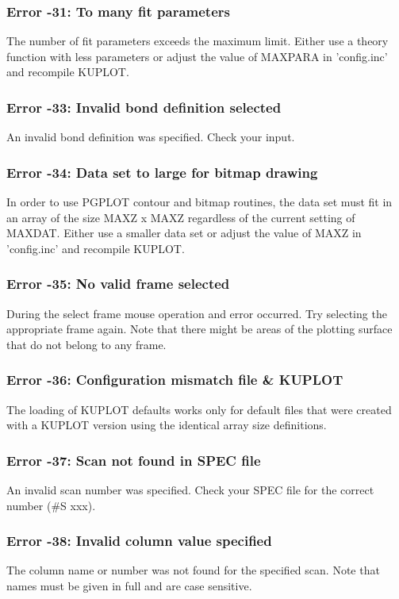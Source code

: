 \subsubsection{Error -31: To many fit parameters}
\par
The number of fit parameters exceeds the maximum limit. Either 
use a theory function with less parameters or adjust the value of 
MAXPARA in 'config.inc' and recompile KUPLOT. 
\subsubsection{Error -33: Invalid bond definition selected}
\par
An invalid bond definition was specified. Check your input. 
\subsubsection{Error -34: Data set to large for bitmap drawing}
\par
In order to use PGPLOT contour and bitmap routines, the data set 
must fit in an array of the size MAXZ x MAXZ regardless of the 
current setting of MAXDAT. Either use a smaller data set or adjust 
the value of MAXZ in 'config.inc' and recompile KUPLOT. 
\subsubsection{Error -35: No valid frame selected}
\par
During the select frame mouse operation and error occurred. Try 
selecting the appropriate frame again. Note that there might be 
areas of the plotting surface that do not belong to any frame. 
\subsubsection{Error -36: Configuration mismatch file \& KUPLOT}
\par
The loading of KUPLOT defaults works only for default files that 
were created with a KUPLOT version using the identical array 
size definitions. 
\subsubsection{Error -37: Scan not found in SPEC file}
\par
An invalid scan number was specified. Check your SPEC file for 
the correct number (\#S xxx). 
\subsubsection{Error -38: Invalid column value specified}
\par
The column name or number was not found for the specified scan. 
Note that names must be given in full and are case sensitive. 
